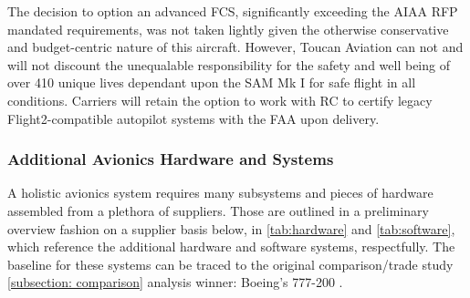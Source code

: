The decision to option an advanced FCS, significantly exceeding the AIAA RFP \cite{RFP} mandated requirements, was not taken lightly given the otherwise conservative and budget-centric nature of this aircraft. However, Toucan Aviation can not and will not discount the unequalable responsibility for the safety and well being of over 410 unique lives dependant upon the SAM Mk I for safe flight in all conditions.  Carriers will retain the option to work with RC to certify legacy Flight2-compatible autopilot systems with the FAA upon delivery.   

\subsubsection{Additional Avionics Hardware and Systems}

A holistic avionics system requires many subsystems and pieces of hardware assembled from a plethora of suppliers.  Those are outlined in a preliminary overview fashion on a supplier basis below, in \ref{tab:hardware} and \ref{tab:software}, which reference the additional hardware and software systems, respectfully.  The baseline for these systems can be traced to the original comparison/trade study \ref{subsection: comparison} analysis winner: Boeing's 777-200 \cite{suppliers}.


